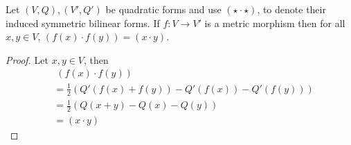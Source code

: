 \begin{prop}
    Let $(V,Q),(V',Q')$ be quadratic forms and 
    use $(\star \cdot \star)$,
    to denote their induced symmetric
    bilinear forms.
    If $f : V \to V'$ is a metric morphism then
    for all $x,y \in V$,
    $(f(x)\cdot f(y)) = (x \cdot y)$.
\end{prop}
\begin{proof}
    Let $x,y\in V$, then 
    \begin{align*}
        &\;(f(x)\cdot f(y)) \\
        &= \frac{1}{2} (Q'(f(x) + f(y)) - Q'(f(x)) - Q'(f(y)))\\
        &= \frac{1}{2} (Q(x + y) - Q(x) - Q(y))\\
        &= (x \cdot y)
    \end{align*}
\end{proof}

